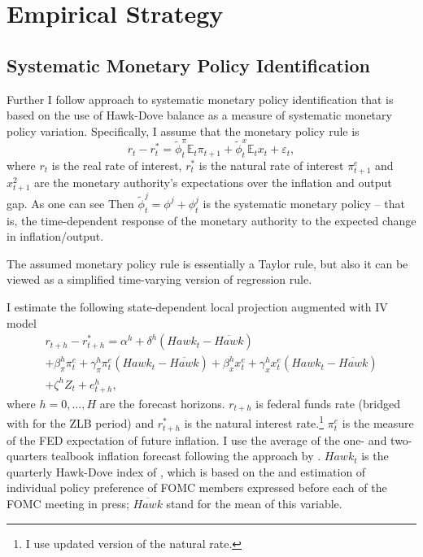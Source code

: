 \documentclass[11pt]{article}
\begin{document}
\section{Empirical Strategy}
\subsection{Systematic Monetary Policy Identification}

Further I follow \citet{HIM2023} approach to systematic monetary policy identification that is based on the use of Hawk-Dove balance as a measure of systematic monetary policy variation. Specifically, I assume that the monetary policy rule is 
\begin{equation}
  r_t-r_t^*=\tilde\phi_{t}^\pi \mathbb{E}_t\pi_{t+1} +\tilde\phi_{t}^x \mathbb{E}_tx_{t}+\varepsilon_t,\label{eq:Taylor1}
\end{equation}
where $r_t$ is the real rate of interest, $r_t^*$ is the natural rate of interest $\pi_{t+1}^e$ and $x_{t+1}^2$ are the monetary authority's expectations over the inflation and output gap. As one can see Then $\tilde \phi_t^{j}=\phi^j+\phi_t^j$ is the systematic monetary policy -- that is, the time-dependent response of the monetary authority to the expected change in inflation/output. 

The assumed monetary policy rule is essentially a Taylor rule, but also it can be viewed as a simplified time-varying version of \citet{RomerRomer2004} regression rule.

I estimate the following state-dependent local projection augmented with IV model \citep{Jorda2005,PlagborgMollerWolf2021}
\begin{multline}
    r_{t+h}-r^*_{t+h}=\alpha^h+\delta^h\left(\mathit{Hawk}_{t}-\overline{\mathit{Hawk}}\right)\\ +\beta_\pi^h \pi_{t}^e+\gamma_\pi^h \pi_{t}^e\left(\mathit{Hawk}_{t}-\overline{\mathit{Hawk}}\right)+\beta_x^h x_{t}^e+\gamma_x^h x_{t}^e\left(\mathit{Hawk}_{t}-\overline{\mathit{Hawk}}\right)\\+\zeta^hZ_t+e_{t+h}^h,\label{eq:LP1}
\end{multline}
where $h=0,\dots, H$ are the forecast horizons. $r_{t+h}$ is federal funds rate (bridged with \citet{WuXia2016} for the ZLB period) and $r^*_{t+h}$ is the \citet{LW2003} natural interest rate.\footnote{I use \citet{HLW2023} updated version of the \citet{LW2003} natural rate.}
$\pi_t^e$ is the measure of the FED expectation of future inflation. I use the average of the one- and two-quarters  tealbook inflation forecast following the approach by \citet{CoibionGorodnichenko2011}. 
$\mathit{Hawk}_t$ is the quarterly Hawk-Dove index of \citet{HIM2023}, which is based on the \citet{Istrefi2019} and \citet{BordoIstrefi2023} estimation of individual policy preference of FOMC members expressed before each of the FOMC meeting in press; $\overline{\mathit{Hawk}}$ stand for the mean of this variable. 
\end{document}
